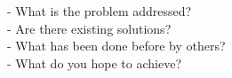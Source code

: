 - What is the problem addressed? \\
- Are there existing solutions? \\
- What has been done before by others? \\ 
- What do you hope to achieve?